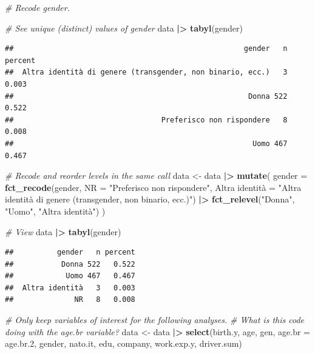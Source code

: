 \documentclass[
]{book}
\newenvironment{Shaded}{\begin{snugshade}}{\end{snugshade}}
\newcommand{\AttributeTok}[1]{\textcolor[rgb]{0.13,0.29,0.53}{#1}}
\newcommand{\CommentTok}[1]{\textcolor[rgb]{0.56,0.35,0.01}{\textit{#1}}}
\newcommand{\FloatTok}[1]{\textcolor[rgb]{0.00,0.00,0.81}{#1}}
\newcommand{\FunctionTok}[1]{\textcolor[rgb]{0.13,0.29,0.53}{\textbf{#1}}}
\newcommand{\NormalTok}[1]{#1}
\newcommand{\OtherTok}[1]{\textcolor[rgb]{0.56,0.35,0.01}{#1}}
\newcommand{\SpecialCharTok}[1]{\textcolor[rgb]{0.81,0.36,0.00}{\textbf{#1}}}
\newcommand{\StringTok}[1]{\textcolor[rgb]{0.31,0.60,0.02}{#1}}
\begin{document}
\begin{Shaded}
\begin{Highlighting}[]
\CommentTok{\# Recode gender.}

\CommentTok{\# See unique (distinct) values of gender}
\NormalTok{data }\SpecialCharTok{|\textgreater{}} 
  \FunctionTok{tabyl}\NormalTok{(gender)}
\end{Highlighting}
\end{Shaded}

\begin{verbatim}
##                                                     gender   n percent
##  Altra identità di genere (transgender, non binario, ecc.)   3   0.003
##                                                      Donna 522   0.522
##                                  Preferisco non rispondere   8   0.008
##                                                       Uomo 467   0.467
\end{verbatim}

\begin{Shaded}
\begin{Highlighting}[]
\CommentTok{\# Recode and reorder levels in the same call}
\NormalTok{data }\OtherTok{\textless{}{-}}\NormalTok{ data }\SpecialCharTok{|\textgreater{}} 
  \FunctionTok{mutate}\NormalTok{(}
    \AttributeTok{gender =} \FunctionTok{fct\_recode}\NormalTok{(gender, }
                        \AttributeTok{NR =} \StringTok{"Preferisco non rispondere"}\NormalTok{,}
                        \StringTok{\textasciigrave{}}\AttributeTok{Altra identità}\StringTok{\textasciigrave{}} \OtherTok{=} \StringTok{"Altra identità di genere (transgender, non binario, ecc.)"}\NormalTok{) }\SpecialCharTok{|\textgreater{}} 
      \FunctionTok{fct\_relevel}\NormalTok{(}\StringTok{"Donna"}\NormalTok{, }\StringTok{"Uomo"}\NormalTok{, }\StringTok{"Altra identità"}\NormalTok{)}
\NormalTok{  )}

\CommentTok{\# View}
\NormalTok{data }\SpecialCharTok{|\textgreater{}} 
  \FunctionTok{tabyl}\NormalTok{(gender)}
\end{Highlighting}
\end{Shaded}

\begin{verbatim}
##          gender   n percent
##           Donna 522   0.522
##            Uomo 467   0.467
##  Altra identità   3   0.003
##              NR   8   0.008
\end{verbatim}

\begin{Shaded}
\begin{Highlighting}[]
\CommentTok{\# Only keep variables of interest for the following analyses.}
\CommentTok{\# What is this code doing with the age.br variable?}
\NormalTok{data }\OtherTok{\textless{}{-}}\NormalTok{ data }\SpecialCharTok{|\textgreater{}} 
  \FunctionTok{select}\NormalTok{(birth.y, age, gen, }\AttributeTok{age.br =}\NormalTok{ age.br}\FloatTok{.2}\NormalTok{, gender, nato.it, edu, company, work.exp.y, driver.sum)}
\end{Highlighting}
\end{Shaded}
\end{document}
